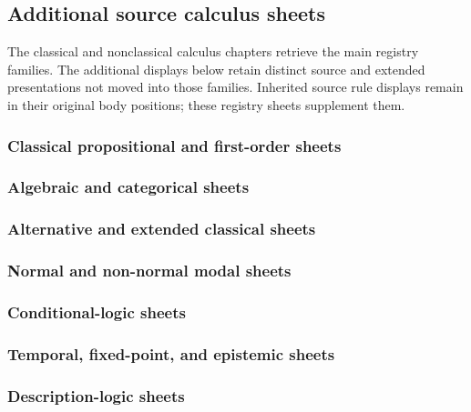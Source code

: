 \subsection{Additional source calculus sheets}\label{sec:p14-rule-sheets}

The classical and nonclassical calculus chapters retrieve the main registry
families. The additional displays below retain distinct source and extended
presentations not moved into those families. Inherited source rule displays
remain in their original body positions; these registry sheets supplement them.

\subsubsection{Classical propositional and first-order sheets}

\subsubsection{Algebraic and categorical sheets}

\subsubsection{Alternative and extended classical sheets}

\subsubsection{Normal and non-normal modal sheets}

\subsubsection{Conditional-logic sheets}

\subsubsection{Temporal, fixed-point, and epistemic sheets}

\subsubsection{Description-logic sheets}

